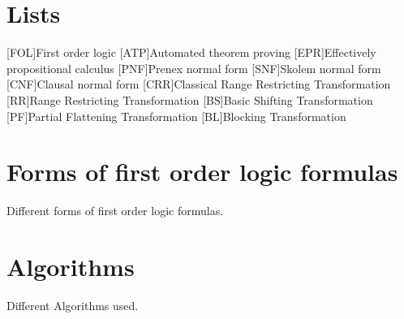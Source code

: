 \appendix
\renewcommand{\appendixtocname}{Appendix}
\renewcommand{\appendixpagename}{\appendixtocname}
\addappheadtotoc
{}
\appendixpage

\chapter{Lists}
\begin{acronym}[\hspace{3cm}]
  [FOL]{First order logic}
  [ATP]{Automated theorem proving}
  [EPR]{Effectively propositional calculus}
  [PNF]{Prenex normal form}
  [SNF]{Skolem normal form}
  [CNF]{Clausal normal form}
  [CRR]{Classical Range Restricting Transformation}
  [RR]{Range Restricting Transformation}
  [BS]{Basic Shifting Transformation}
  [PF]{Partial Flattening Transformation}
  [BL]{Blocking Transformation}
\end{acronym}
\clearpage
\listoffigures
{}
\listoftables
{}

\chapter{Forms of first order logic formulas}
Different forms of first order logic formulas.

\chapter{Algorithms}
Different Algorithms used.
